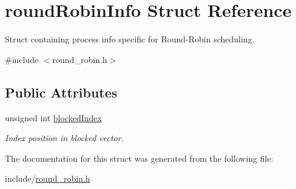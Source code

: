 \hypertarget{structroundRobinInfo}{\section{round\-Robin\-Info \-Struct \-Reference}
\label{d2/de3/structroundRobinInfo}
}


\-Struct containing process info specific for \-Round-\/\-Robin scheduling.  




{\ttfamily \#include $<$round\-\_\-robin.\-h$>$}

\subsection*{\-Public \-Attributes}
\begin{DoxyCompactItemize}
\item 
\hypertarget{structroundRobinInfo_a6c27850c4a7950e4aaa7cbcd532dca4b}{unsigned int \hyperlink{structroundRobinInfo_a6c27850c4a7950e4aaa7cbcd532dca4b}{blocked\-Index}}\label{d2/de3/structroundRobinInfo_a6c27850c4a7950e4aaa7cbcd532dca4b}

\begin{DoxyCompactList}\small\item\em \-Index position in blocked vector. \end{DoxyCompactList}\end{DoxyCompactItemize}


\-The documentation for this struct was generated from the following file\-:\begin{DoxyCompactItemize}
\item 
include/\hyperlink{round__robin_8h}{round\-\_\-robin.\-h}\end{DoxyCompactItemize}
